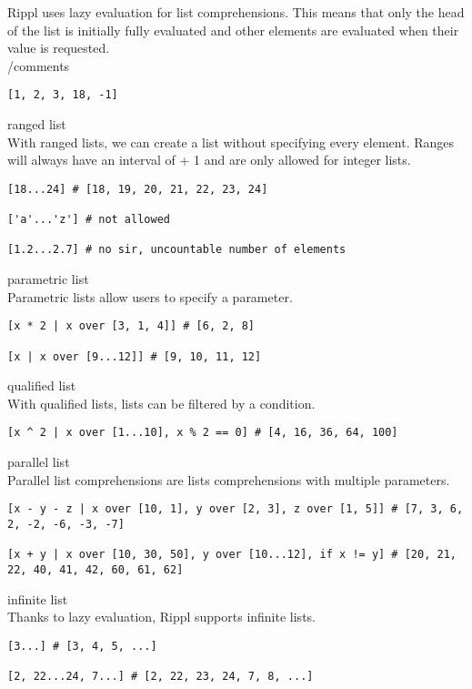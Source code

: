 ﻿\documentclass[5pt]{article}
\begin{document}
Rippl uses lazy evaluation for list comprehensions. This means that only the head of the list is initially fully evaluated and other elements are evaluated when their value is requested. \\
/comments

\begin{lstlisting}[language=rippl]
[1, 2, 3, 18, -1]
\end{lstlisting}


ranged list \\
With ranged lists, we can create a list without specifying every element. Ranges will always have an interval of + 1 and are only allowed for integer lists. 

\begin{lstlisting}[language=rippl]
[18...24] # [18, 19, 20, 21, 22, 23, 24]

['a'...'z'] # not allowed

[1.2...2.7] # no sir, uncountable number of elements
\end{lstlisting}

parametric list \\
Parametric lists allow users to specify a parameter.

\begin{lstlisting}[language=rippl]
[x * 2 | x over [3, 1, 4]] # [6, 2, 8] 

[x | x over [9...12]] # [9, 10, 11, 12]
\end{lstlisting}


qualified list \\
With qualified lists, lists can be filtered by a condition.

\begin{lstlisting}[language=rippl]
[x ^ 2 | x over [1...10], x % 2 == 0] # [4, 16, 36, 64, 100]
\end{lstlisting}


parallel list \\
Parallel list comprehensions are lists comprehensions with multiple parameters.

\begin{lstlisting}[language=rippl]
[x - y - z | x over [10, 1], y over [2, 3], z over [1, 5]] # [7, 3, 6, 2, -2, -6, -3, -7]

[x + y | x over [10, 30, 50], y over [10...12], if x != y] # [20, 21, 22, 40, 41, 42, 60, 61, 62]
\end{lstlisting}

infinite list \\
Thanks to lazy evaluation, Rippl supports infinite lists. 

\begin{lstlisting}[language=rippl]
[3...] # [3, 4, 5, ...] 

[2, 22...24, 7...] # [2, 22, 23, 24, 7, 8, ...]
\end{lstlisting}
\end{document}

